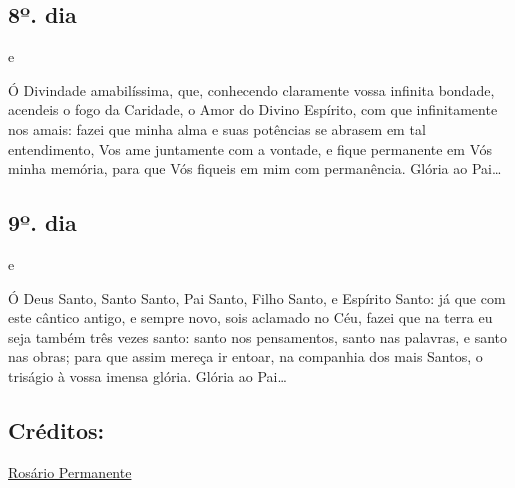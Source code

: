 \documentclass[18pt]{article}
\begin{document}
\subsection*{8º. dia}

\textbf{} e  \textbf{} 

Ó Divindade amabilíssima, que, conhecendo claramente vossa infinita bondade, acendeis o fogo da Caridade, o Amor do Divino Espírito, com que infinitamente nos amais: fazei que minha alma e suas potências se abrasem em tal entendimento, Vos ame juntamente com a vontade, e fique permanente em Vós minha memória, para que Vós fiqueis em mim com permanência.
Glória ao Pai…

\textbf{}

\subsection*{9º. dia}

\textbf{} e  \textbf{} 

Ó Deus Santo, Santo Santo, Pai Santo, Filho Santo, e Espírito Santo: já que com este cântico antigo, e sempre novo, sois aclamado no Céu, fazei que na terra eu seja também três vezes santo: santo nos pensamentos, santo nas palavras, e santo nas obras; para que assim mereça ir entoar, na companhia dos mais Santos, o triságio à vossa imensa glória.
Glória ao Pai…

\textbf{}


\vfill

\subsection*{Créditos:}
\href{https://rosariopermanente.leiame.net.br/novena-a-santissima-trindade/}{Rosário Permanente}
\end{document}
